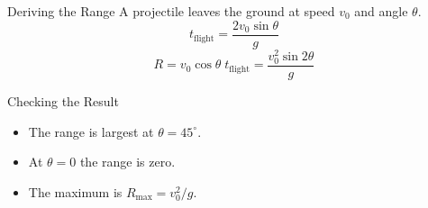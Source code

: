 \documentclass{beamer}
\begin{document}
\begin{frame}{Deriving the Range}
  A projectile leaves the ground at speed $v_0$ and angle $\theta$.
  \pause
  \begin{equation*}
    t_{\text{flight}} = \frac{2 v_0 \sin\theta}{g}
  \end{equation*}
  \pause
  \begin{equation*}
    R = v_0 \cos\theta \; t_{\text{flight}} = \frac{v_0^2 \sin 2\theta}{g}
  \end{equation*}
\end{frame}

\begin{frame}{Checking the Result}
  \begin{itemize}
    \item<1-> The range is largest at $\theta = 45^\circ$.
    \item<2-> At $\theta = 0$ the range is zero.
    \item<3-> The maximum is $R_{\max} = v_0^2 / g$.
  \end{itemize}
\end{frame}
\end{document}

